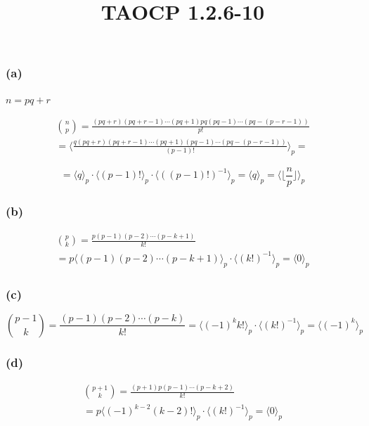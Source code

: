 \documentclass{article}
\title{TAOCP 1.2.6\mbox{-}10}
\begin{document}
\maketitle

\subsubsection*{(a)}

\( n = pq + r \)

\begin{multline*}
\binom{n}{p} = \frac{(pq+r)(pq+r-1)\cdots(pq+1)pq(pq-1)\cdots(pq-(p-r-1))}{p!} \\
= \langle\frac{q(pq+r)(pq+r-1)\cdots(pq+1)(pq-1)\cdots(pq-(p-r-1))}{(p-1)!}\rangle_{p} =
\end{multline*}

\[ = \langle q \rangle_{p} \cdot \langle(p-1)!\rangle_{p} \cdot \langle{((p-1)!)}^{-1}\rangle_{p} = \langle q \rangle_{p} = \langle \lfloor\frac{n}{p}\rfloor \rangle_{p} \]

\subsubsection*{(b)}

\begin{multline*}
\binom{p}{k} = \frac{p(p-1)(p-2)\cdots(p-k+1)}{k!} \\
= p\langle(p-1)(p-2)\cdots(p-k+1)\rangle_{p} \cdot \langle{(k!)}^{-1}\rangle_{p} = \langle 0 \rangle_{p}
\end{multline*}

\subsubsection*{(c)}

\[ \binom{p-1}{k} = \frac{(p-1)(p-2)\cdots(p-k)}{k!} = \langle{(-1)}^{k} k!\rangle_{p} \cdot \langle{(k!)}^{-1}\rangle_{p} = \langle{(-1)}^{k} \rangle_{p} \]

\subsubsection*{(d)}

\begin{multline*}
\binom{p+1}{k} = \frac{(p+1)p(p-1)\cdots(p-k+2)}{k!} \\
= p\langle{(-1)}^{k-2}(k-2)!\rangle_{p} \cdot \langle{(k!)}^{-1}\rangle_{p} = \langle 0 \rangle_{p}
\end{multline*}
\end{document}
